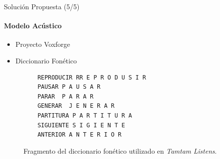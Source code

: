 \begin{frame}[fragile]{Soluci\'on Propuesta (5/5)}
\framesubtitle{Modelo Acústico}
\begin{itemize}
    \item Proyecto Voxforge
    \item Diccionario Fonético    
\end{itemize}

    \begin{figure}[H]
    \begin{lstlisting}
    REPRODUCIR RR E P R O D U S I R
    PAUSAR P A U S A R
    PARAR  P A R A R
    GENERAR  J E N E R A R
    PARTITURA P A R T I T U R A
    SIGUIENTE S I G I E N T E
    ANTERIOR A N T E R I O R
    \end{lstlisting}
    \caption{Fragmento del diccionario fon\'etico utilizado en \emph{Tamtam Listens}.}
    \label{figure:fragmento-dic}
\end{figure}

\end{frame}


